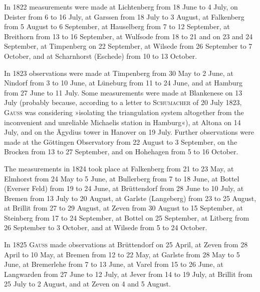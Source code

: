 \par\noindent\hspace*{\parindent}In 1822 measurements were made at Lichtenberg from 18 June to 4 July, on Deister from 6 to 16 July, at Garssen from 18 July to 3 August, at Falkenberg from 5 August to 6 September, at Hauselberg from 7 to 12 September, at Breithorn from 13 to 16 September, at Wulfsode from 18 to 21 and on 23 and 24 September, at Timpenberg on 22 September, at Wilsede from 26 September to 7 October, and at Scharnhorst (Eschede) from 10 to 13 October.

\par\noindent\hspace*{\parindent}In 1823 observations were made at Timpenberg from 30 May to 2 June, at Nindorf from 3 to 10 June, at Lüneburg from 11 to 24 June, and at Hamburg from 27 June to 11 July. Some measurements were made at Blankenese on 13 July (probably because, according to a letter to \textsc{Schumacher} of 20 July 1823, \textsc{Gauss} was considering »isolating the triangulation system altogether from the inconvenient and unreliable Michaelis station in Hamburg«), at Altona on 14 July, and on the Ägydius tower in Hanover on 19 July. Further observations were made at the Göttingen Observatory from 22 August to 3 September, on the Brocken from 13 to 27 September, and on Hohehagen from 5 to 16 October.

\par\noindent\hspace*{\parindent}The measurements in 1824 took place at Falkenberg from 21 to 23 May, at Elmhorst from 24 May to 5 June, at Bullerberg from 7 to 18 June, at Bottel (Everser Feld) from 19 to 24 June, at Brüttendorf from 28 June to 10 July, at Bremen from 13 July to 20 August, at Garlste (Langeberg) from 23 to 25 August, at Brillit from 27 to 29 August, at Zeven from 30 August to 15 September, at Steinberg from 17 to 24 September, at Bottel on 25 September, at Litberg from 26 September to 3 October, and at Wilsede from 5 to 24 October.

\par\noindent\hspace*{\parindent}In 1825 \textsc{Gauss} made observations at Brüttendorf on 25 April, at Zeven from 28 April to 10 May, at Bremen from 12 to 22 May, at Garlste from 28 May to 5 June, at Bremerlehe from 7 to 13 June, at Varel from 15 to 26 June, at Langwarden from 27 June to 12 July, at Jever from 14 to 19 July, at Brillit from 25 July to 2 August, and at Zeven on 4 and 5 August.

